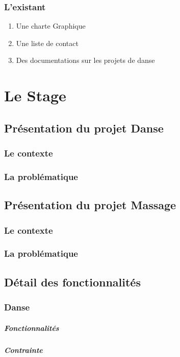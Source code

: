 \documentclass[11pt,a4paper]{report}
\begin{document}
		\subsection{L'existant}
			\begin{enumerate}
				\item Une charte Graphique
				\item Une liste de contact
				\item Des documentations sur les projets de danse
			\end{enumerate}
\chapter{Le Stage}
	\section{Présentation du projet Danse}
		\subsection{Le contexte}
		\subsection{La problématique}
	\section{Présentation du projet Massage}
		\subsection{Le contexte}
		\subsection{La problématique}
	\section{Détail des fonctionnalités}
		\subsection{Danse}
			\paragraph{Fonctionnalités}
			\paragraph{Contrainte}
\end{document}
